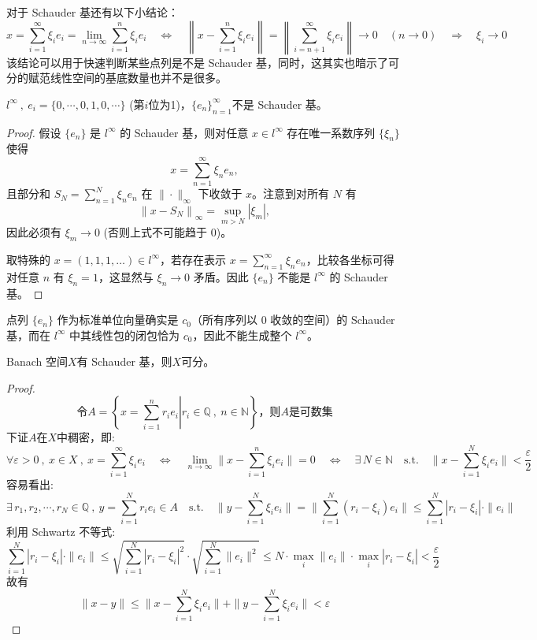 对于 Schauder 基还有以下小结论：
\[x=\sum_{i=1}^{\infty}\xi_ie_i=\lim_{n \to \infty}\sum_{i=1}^{n}\xi_ie_i \quad \Leftrightarrow \quad \left\|x-\sum_{i=1}^n\xi_ie_i\right\|=\left\|\sum_{i=n+1}^{\infty}\xi_ie_i\right\| \rightarrow 0 \quad (n \rightarrow 0) \quad \Rightarrow \quad \xi_i \rightarrow 0\]
该结论可以用于快速判断某些点列是不是 Schauder 基，同时，这其实也暗示了可分的赋范线性空间的基底数量也并不是很多。
\begin{example}
\quad $l^{\infty} \ , \ e_i=\{0,\cdots,0,1,0,\cdots\}$ (第$i$位为1)，$\{e_n\}_{n=1}^{\infty}$不是 Schauder 基。
\end{example}
\begin{proof}
假设 $\{e_n\}$ 是 $l^{\infty}$ 的 Schauder 基，则对任意 $x\in l^{\infty}$ 存在唯一系数序列 $\{\xi_n\}$ 使得
\[ x=\sum_{n=1}^{\infty}\xi_n e_n,\]
且部分和 $S_N=\sum_{n=1}^N\xi_n e_n$ 在 $\|\cdot\|_{\infty}$ 下收敛于 $x$。注意到对所有 $N$ 有
\[ \left\|x-S_N\right\|_{\infty}=\sup_{m>N}|\xi_m|,\]
因此必须有 $\xi_m\to0$ (否则上式不可能趋于 $0$)。

取特殊的 $x=(1,1,1,\dots)\in l^{\infty}$，若存在表示 $x=\sum_{n=1}^{\infty}\xi_n e_n$，比较各坐标可得对任意 $n$ 有 $\xi_n=1$，这显然与 $\xi_n\to0$ 矛盾。因此 $\{e_n\}$ 不能是 $l^{\infty}$ 的 Schauder 基。
\end{proof}

\begin{remark}
点列 $\{e_n\}$ 作为标准单位向量确实是 $c_0$（所有序列以 $0$ 收敛的空间）的 Schauder 基，而在 $l^{\infty}$ 中其线性包的闭包恰为 $c_0$，因此不能生成整个 $l^{\infty}$。
\end{remark}

\begin{theorem}
Banach 空间$X$有 Schauder 基，则$X$可分。
\end{theorem}
\begin{proof}
\[\text{令}A=\left\{\left.x=\sum_{i=1}^nr_ie_i\right|r_i \in \mathbb{Q} \ , \ n \in \mathbb{N}\right\}\text{，则$A$是可数集}\]
下证$A$在$X$中稠密，即:
\[\forall \varepsilon>0 \ , \ x \in X \ , \ x=\sum_{i=1}^{\infty}\xi_ie_i \quad \Leftrightarrow \quad \lim_{n \to \infty}\|x-\sum_{i=1}^n\xi_ie_i\|=0 \quad \Leftrightarrow \quad \exists \, N \in \mathbb{N} \quad \text{s.t.} \quad \|x-\sum_{i=1}^N\xi_ie_i\|<\frac{\varepsilon}{2}\]
容易看出:
\[\exists \, r_1,r_2,\cdots,r_N \in \mathbb{Q} \ , \ y=\sum_{i=1}^Nr_ie_i \in A \quad \text{s.t.} \quad \|y-\sum_{i=1}^N\xi_ie_i\|=\|\sum_{i=1}^N(r_i-\xi_i)e_i\| \leq \sum_{i=1}^N|r_i-\xi_i|\cdot\|e_i\|\]
利用 Schwartz 不等式:
\[\sum_{i=1}^N|r_i-\xi_i|\cdot\|e_i\| \leq \sqrt{\sum_{i=1}^N|r_i-\xi_i|^2} \cdot \sqrt{\sum_{i=1}^N\|e_i\|^2} \leq N \cdot \mathop \text{max}\limits_i\|e_i\| \cdot \mathop \text{max}\limits_i|r_i-\xi_i|<\frac{\varepsilon}{2}\]
故有
\[\|x-y\| \leq \|x-\sum_{i=1}^N\xi_ie_i\|+\|y-\sum_{i=1}^N\xi_ie_i\|<\varepsilon\]
\end{proof}

